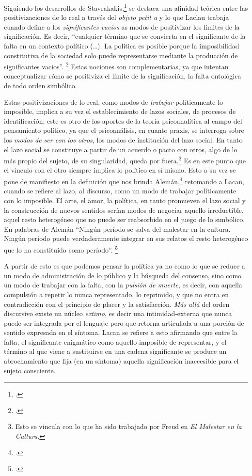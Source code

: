 Siguiendo los desarrollos de Stavrakakis,\footcite[]{@7003-STAVRAKAKIS2010} se destaca una afinidad teórica entre las positivizaciones de lo real a través del \emph{objeto petit a} y lo que Laclau trabaja cuando define a los \emph{significantes vacíos} as modos de positivizar los límites de la significación. Es decir, \enquote{cualquier término que se convierta en el significante de la falta en un contexto político (\ldots). La política es posible porque la imposibilidad constitutiva de la sociedad solo puede representarse mediante la producción de significantes vacíos}. \footcite[][44]{@7112-LACLAU1996} Estas nociones son complementarias, ya que intentan conceptualizar cómo se positiviza el límite de la significación, la falta ontológica de todo orden simbólico.

Estas positivizaciones de lo real, como modos de \emph{trabajar} políticamente lo imposible, implica a su vez el establecimiento de lazos sociales, de procesos de identificación; este es otro de los aportes de la teoría psicoanalítica al campo del pensamiento político, ya que el psicoanálisis, en cuanto praxis, se interroga sobre los \emph{modos de ser con los otros}, los modos de institución del lazo social. En tanto el lazo social se constituye a partir de un acuerdo o pacto con otros, algo de lo más propio del sujeto, de su singularidad, queda por fuera.\footnote{Esto se vincula con lo que ha sido trabajado por Freud en \emph{El Malestar en la Cultura}.} Es en este punto que el vínculo con el otro siempre implica lo político en sí mismo. Esto a su vez se pone de manifiesto en la definición que nos brinda Alemán,\footcite[]{@7108-ALEMAN2010} retomando a Lacan, cuando se refiere al lazo, al discurso, como un modo de trabajar políticamente con lo imposible. El arte, el amor, la política, en tanto promueven el lazo social y la construcción de nuevos sentidos serían modos de negociar aquello irreductible, aquel resto heterogéneo que no puede ser reabsorbido en el juego de lo simbólico. En palabras de Alemán \enquote{Ningún período se salva del malestar en la cultura. Ningún período puede verdaderamente integrar en sus relatos el resto heterogéneo que lo ha constituido como período}. \footcite[][61]{@7108-ALEMAN2010}

A partir de esto es que podemos pensar la política ya no como lo que se reduce a un modo de administración de lo público y la búsqueda del consenso, sino como un modo de trabajar con la falta, con la \emph{pulsión de muerte}, es decir, con aquella compulsión a repetir lo nunca representado, lo reprimido, y que no entra en contradicción con el principio de placer y la satisfacción. \emph{Más allá} del orden discursivo existe un núcleo \emph{extimo}, es decir una intimidad-externa que nunca puede ser integrada por el lenguaje pero que retorna articulada a una porción de sentido expresada en el síntoma. Lacan se refiere a esto afirmando que entre la falta, el significante enigmático como aquello imposible de representar, y el término al que viene a sustituirse en una cadena significante se produce un abrochamiento que fija (en un síntoma) aquella significación inaccesible para el sujeto consciente.

